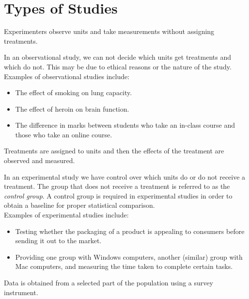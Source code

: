 \section{Types of Studies}

\begin{definition}	
Experimenters observe units and take measurements without assigning treatments.
\end{definition}

In an observational study, we can not decide which units get treatments and which do not. This may be due to ethical reasons or the nature of the study.\\

\noindent
Examples of observational studies include:
\begin{itemize}
\item	The effect of smoking on lung capacity.
\item	The effect of heroin on brain function.
\item	The difference in marks between students who take an in-class course and those who take an online course.
\end{itemize}

\begin{definition}	
Treatments are assigned to units and then the effects of the treatment are observed and measured.
\end{definition}

\noindent
In an experimental study we have control over which units do or do not receive a treatment. The group that does not receive a treatment is referred to as the \textit{control group}. A control group is required in experimental studies in order to obtain a baseline for proper statistical comparison.\\

\noindent
Examples of experimental studies include:

	\begin{itemize}
	\item	Testing whether the packaging of a product is appealing to consumers before sending it out to the market.
	\item Providing one group with Windows computers, another (similar) group with Mac computers, and measuring the time taken to complete certain tasks.
	\end{itemize} 

\begin{definition}	
Data is obtained from a selected part of the population using a survey instrument.
\end{definition}

